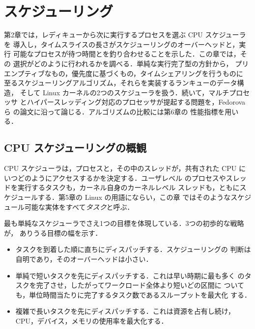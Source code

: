 \documentclass[../main.tex]{subfiles}
\begin{document}
\chapter{スケジューリング}

第2章では，レディキューから次に実行するプロセスを選ぶ CPU スケジューラを
導入し，タイムスライスの長さがスケジューリングのオーバーヘッドと，実行
可能なプロセスが待つ時間とを釣り合わせることを示した．この章では，その
選択がどのように行われるかを調べる．単純な実行完了型の方針から，
プリエンプティブなもの，優先度に基づくもの，タイムシェアリングを行うものに
至るスケジューリングアルゴリズム，それらを実装するランキューのデータ構造，
そして Linux カーネルの2つのスケジューラを扱う．続いて，マルチプロセッサ
とハイパースレッディング対応のプロセッサが提起する問題を，Fedorova ら
\cite{fedorova2004} の論文に沿って論じる．アルゴリズムの比較には第6章の
性能指標を用いる．

\section{CPU スケジューリングの概観}
\label{sec:l07-overview}

CPU スケジューラは，プロセスと，その中のスレッドが，共有された CPU に
いつどのようにアクセスするかを決定する．ユーザレベル
のプロセスやスレッドを実行するタスクも，カーネル自身のカーネルレベル
スレッドも，ともにスケジュールする．第5章の Linux の用語にならい，この章
ではそのようなスケジュール可能な実体をすべて\emph{タスク}と呼ぶ．

最も単純なスケジューラでさえ1つの目標を体現している．3つの初歩的な戦略が，
ありうる目標の幅を示す．
\begin{itemize}
  \item タスクを到着した順に直ちにディスパッチする．スケジューリングの
    判断は自明であり，そのオーバーヘッドは小さい．
  \item 単純で短いタスクを先にディスパッチする．これは早い時期に最も多く
    のタスクを完了させ，したがってワークロード全体より短いどの区間に
    ついても，単位時間当たりに完了するタスク数であるスループットを最大化
    する．
  \item 複雑で長いタスクを先にディスパッチする．これは資源を占有し続け，
    CPU，デバイス，メモリの使用率を最大化する．
\end{itemize}
\end{document}
